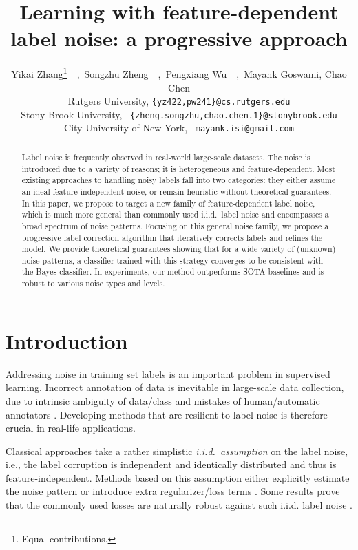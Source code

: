 \documentclass{article} \usepackage{iclr2021_conference,times}
\title{Learning with feature-dependent label noise: a progressive approach}
\author{Yikai Zhang\thanks{Equal contributions.}~~,~Songzhu Zheng\footnotemark[1]~~,~Pengxiang Wu\footnotemark[1]~~,~Mayank Goswami, Chao Chen \\
Rutgers University, \texttt{\{yz422,pw241\}@cs.rutgers.edu} \\ 
Stony Brook University, ~\texttt{\{zheng.songzhu,chao.chen.1\}@stonybrook.edu}\\
City University of New York, ~\texttt{mayank.isi@gmail.com}\\
}
\begin{document}
\maketitle

\begin{abstract}
Label noise is frequently observed in real-world large-scale datasets. The noise is introduced due to a variety of reasons; it is heterogeneous and feature-dependent. Most existing approaches to handling noisy labels fall into two categories: they either assume an ideal feature-independent noise, or remain heuristic without theoretical guarantees. 
In this paper, we propose to target a new family of feature-dependent label noise, which is much more general than commonly used i.i.d.~label noise and encompasses a broad spectrum of noise patterns.
Focusing on this general noise family, we propose a progressive label correction algorithm that iteratively corrects labels and refines the model. We provide theoretical guarantees showing that for a wide variety of (unknown) noise patterns, a classifier trained with this strategy converges to be consistent with the Bayes classifier. 
In experiments, our method outperforms SOTA baselines and is robust to various noise types and levels.

\end{abstract}

\section{Introduction}

Addressing noise in training set labels is an important problem in supervised learning. Incorrect annotation of data is inevitable in large-scale data collection, due to intrinsic ambiguity of data/class and mistakes of human/automatic annotators \citep{yan_2014learning,Veit_LearnNoise_CVPR2017}. Developing methods that are resilient to label noise is therefore crucial in real-life applications.

Classical approaches take a rather simplistic \emph{i.i.d.~assumption} on the label noise, i.e., the label corruption is independent and identically distributed and thus is feature-independent. 
Methods based on this assumption either explicitly estimate the noise pattern \citep{reed_bootstrapping_ICLRW2014, patrini_CVPR2017_FCorrection, Hendrycks_selfsuper_2019_ICML, xu_dmi_2019l_NIPS} or introduce extra regularizer/loss terms \citep{natarajan_learning_NIPS2013, Rooyen_unhinge_2015_NIPS, cloth1m, gce_nips2018, Ma_dim_driven_ICML18, dynamic_bootstrap_2019_icml, shen2019learning}. Some results prove that the commonly used losses are naturally robust against such i.i.d. label noise \citep{manwani_noisetolerance_2013, Ghosh_riskmini_2015_NIPS,gao_2016_arXiv, ghosh2017robust,  charoenphakdee2019symmetric, simple_reg_iclr2020}. 
\end{document}
